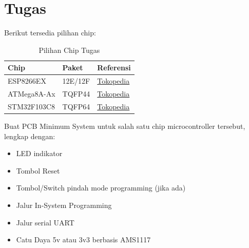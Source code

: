 \documentclass[12pt]{book}
\begin{document}

	\newpage
	\chapter{Tugas}

	Berikut tersedia pilihan chip:

	\begin{table}[h!]
		\begin{center}
			\begin{tabular}{|l|l|l|}
				\toprule
				Chip &  Paket & Referensi \\
				\midrule
				ESP8266EX & 12E/12F & \href{https://www.tokopedia.com/dx-tronics/esp8266-esp-12f-iot-esp12f-esp-12f-esp8266mod}{Tokopedia} \\
				\midrule
				ATMega8A-Ax & TQFP44 & \href{https://www.tokopedia.com/mri/ic-atmega32-atmega-32a-smd-tqfp44-atmel-avr-8-bit-atmega32a-au}{Tokopedia} \\
				\midrule
				STM32F103C8 & TQFP64 & \href{https://www.tokopedia.com/mri/ic-stm32-stm32f103c8t6-lqfp48-arm-based-microcontroller-mcu-stm32}{Tokopedia} \\
				\bottomrule
			\end{tabular}
			\caption{Pilihan Chip Tugas}
		\end{center}
	\end{table}

	Buat PCB Minimum System untuk salah satu chip microcontroller tersebut, lengkap dengan:
	\begin{itemize}
		\item LED indikator
		\item Tombol Reset
		\item Tombol/Switch pindah mode programming (jika ada)
		\item Jalur In-System Programming
		\item Jalur serial UART
		\item Catu Daya 5v atau 3v3 berbasis AMS1117
	\end{itemize}
\end{document}
